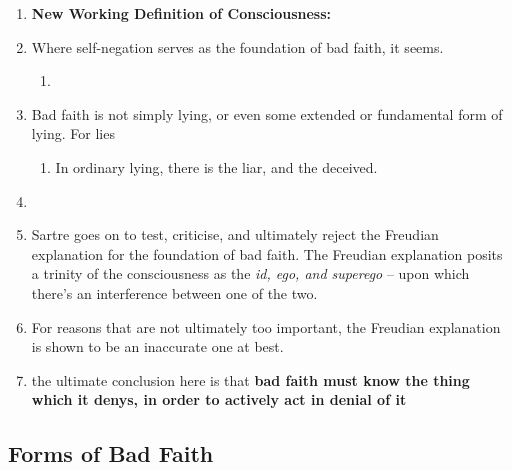 \begin{enumerate}
  \item \textbf{New Working Definition of Consciousness:} 
  \item {} Where self-negation serves as the foundation of bad faith, it seems.
  \begin{enumerate}
    \item {}
  \end{enumerate}
  \item Bad faith is not simply lying, or even some extended or fundamental form of lying. For lies 
  \begin{enumerate}
    \item In ordinary lying, there is the liar, and the deceived.
  \end{enumerate}
  \item {}
  \item Sartre goes on to test, criticise, and ultimately reject the Freudian explanation for the foundation of bad faith. The Freudian explanation posits a trinity of the consciousness as the \emph{id, ego, and superego} -- upon which there's an interference between one of the two.
  \item For reasons that are not ultimately too important, the Freudian explanation is shown to be an inaccurate one at best.
  \item the ultimate conclusion here is that \textbf{bad faith must know the thing which it denys, in order to actively act in denial of it}
\end{enumerate}

\subsection{Forms of Bad Faith}

